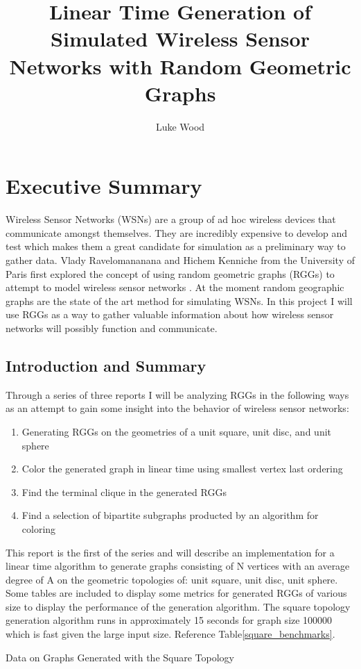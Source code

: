 \documentclass{article}
\begin{document}
  \title{Linear Time Generation of Simulated Wireless Sensor Networks with Random Geometric Graphs}
  \author{Luke Wood}
  \maketitle

  \section{Executive Summary}
	Wireless Sensor Networks (WSNs) are a group of ad hoc wireless devices that communicate amongst themselves.
	They are incredibly expensive to develop and test which makes them a great candidate for simulation as a preliminary way to gather data.
	Vlady Ravelomananana and Hichem Kenniche from the University of Paris first explored the concept of using random geometric graphs (RGGs) to attempt to model wireless sensor networks \cite{kenniche2010random}.
  At the moment random geographic graphs are the state of the art method for simulating WSNs.
	In this project I will use RGGs as a way to gather valuable information about how wireless sensor networks will possibly function and communicate.

  \subsection{Introduction and Summary}
	Through a series of three reports	I will be analyzing RGGs in the following ways as an attempt to gain some insight into the behavior of wireless sensor networks:
	\begin{enumerate}
		\item Generating RGGs on the geometries of a unit square, unit disc, and unit sphere
		\item Color the generated graph in linear time using smallest vertex last ordering
		\item Find the terminal clique in the generated RGGs
		\item Find a selection of bipartite subgraphs producted by an algorithm for coloring
	\end{enumerate}
	This report is the first of the series and will describe an implementation for a linear time algorithm to generate graphs consisting of N vertices with an average degree of A on the geometric topologies of: unit square, unit disc, unit sphere.
	Some tables are included to display some metrics for generated  RGGs of various size to display the performance of the generation algorithm.
	The square topology generation algorithm runs in approximately 15 seconds for graph size 100000 which is fast given the large input size.  Reference Table\ref{square_benchmarks}.
	\begin{center}
	  \begin{table}
      \label{square_benchmarks}
			\caption{Data on Graphs Generated with the Square Topology}
		\end{table}
	\end{center}
\end{document}
